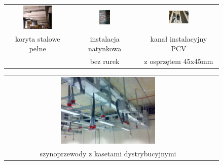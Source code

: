 \begin{figure}[ht!]
\begin{center}\begin{tabular}{ccc}
\includegraphics[trim={0 14cm 0 0},clip,width=0.47\textwidth]{elektryka/OrganizedElectricalWiring.jpg} & %
\includegraphics[trim={6cm 0 2cm 0},clip,width=0.176\textwidth]{elektryka/IMG_20210731_145157.jpg} &
\includegraphics[trim={10cm 0 50cm 0},clip,width=0.263\textwidth]{elektryka/Cabtray_03.jpg} %
\\
koryta stalowe pełne &
instalacja natynkowa &
kanał instalacyjny PCV
\\
&
bez rurek &
z osprzętem 45x45mm
\end{tabular}\end{center}

\begin{center}\begin{tabular}{cc}
\includegraphics[width=0.47\textwidth]{elektryka/szynoprzewody.jpg} &
\\
szynoprzewody z kasetami dystrybucyjnymi &
\end{tabular}\end{center}
\end{figure}

